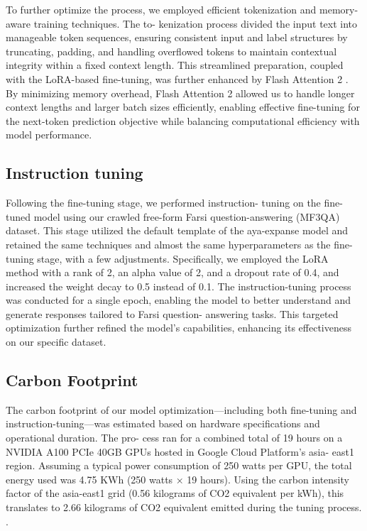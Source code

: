 \documentclass[conference]{IEEEtran}
\begin{document}
To further optimize the process, we employed efficient
tokenization and memory-aware training techniques. The to-
kenization process divided the input text into manageable
token sequences, ensuring consistent input and label structures
by truncating, padding, and handling overflowed tokens to
maintain contextual integrity within a fixed context length.
This streamlined preparation, coupled with the LoRA-based
fine-tuning, was further enhanced by Flash Attention 2 
\cite{b27}.
By minimizing memory overhead, Flash Attention 2 allowed
us to handle longer context lengths and larger batch sizes
efficiently, enabling effective fine-tuning for the next-token
prediction objective while balancing computational efficiency
with model performance.
\subsection{Instruction tuning}
Following the fine-tuning stage, we performed instruction-
tuning on the fine-tuned model using our crawled free-form
Farsi question-answering (MF3QA) dataset. This stage utilized
the default template of the aya-expanse model and retained
the same techniques and almost the same hyperparameters as
the fine-tuning stage, with a few adjustments. Specifically, we
employed the LoRA method with a rank of 2, an alpha value
of 2, and a dropout rate of 0.4, and increased the weight
decay to 0.5 instead of 0.1. The instruction-tuning process
was conducted for a single epoch, enabling the model to better
understand and generate responses tailored to Farsi question-
answering tasks. This targeted optimization further refined the
model’s capabilities, enhancing its effectiveness on our specific
dataset.
\subsection{Carbon Footprint}
The carbon footprint of our model optimization—including
both fine-tuning and instruction-tuning—was estimated based
on hardware specifications and operational duration. The pro-
cess ran for a combined total of 19 hours on a NVIDIA A100
PCIe 40GB GPUs hosted in Google Cloud Platform’s asia-
east1 region. Assuming a typical power consumption of 250
watts per GPU, the total energy used was 4.75 KWh (250
watts × 19 hours). Using the carbon intensity factor of the
asia-east1 grid (0.56 kilograms of CO2 equivalent per kWh),
this translates to 2.66 kilograms of CO2 equivalent emitted
during the tuning process.
\cite{b28}
.
\end{document}
